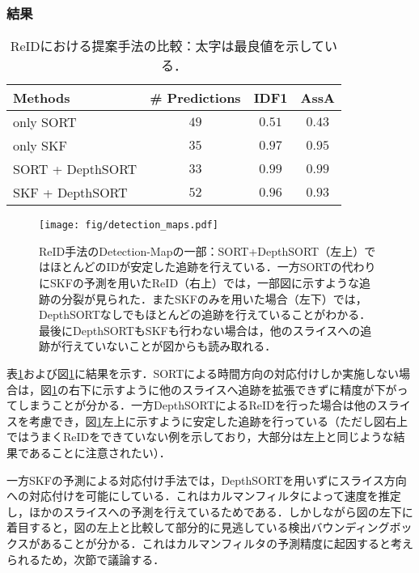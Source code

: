         \subsubsection{結果}

        \begin{table}[t]
            \centering
            \caption[ReIDにおける提案手法の比較]{ReIDにおける提案手法の比較：太字は最良値を示している．}
            \label{tab:reid_evaulation_assa}
            \begin{tabular}{l|ccc}
                Methods & \# Predictions & IDF1 & AssA
                \\ \hline \hline
                only SORT & $49$ & $0.51$ & $0.43$
                \\ only SKF & $35$ & $0.97$ & $0.95$
                \\ SORT + DepthSORT & $33$ & $\bm{0.99}$ & $\bm{0.99}$
                \\ SKF + DepthSORT & $52$ & $0.96$ & $0.93$
            \end{tabular}
        \end{table}

        \begin{figure}[t]
            \centering
            \texttt{[image: fig/detection\_maps.pdf]}
            \caption[ReID手法のDetection-Mapの一部]{ReID手法のDetection-Mapの一部：SORT+DepthSORT（左上）ではほとんどのIDが安定した追跡を行えている．一方SORTの代わりにSKFの予測を用いたReID（右上）では，一部図に示すような追跡の分裂が見られた．またSKFのみを用いた場合（左下）では，DepthSORTなしでもほとんどの追跡を行えていることがわかる．最後にDepthSORTもSKFも行わない場合は，他のスライスへの追跡が行えていないことが図からも読み取れる．}
            \label{fig:detection_maps}
        \end{figure}

        表\ref{tab:reid_evaulation_assa}および図\ref{fig:detection_maps}に結果を示す．SORTによる時間方向の対応付けしか実施しない場合は，図\ref{fig:detection_maps}の右下に示すように他のスライスへ追跡を拡張できずに精度が下がってしまうことが分かる．一方DepthSORTによるReIDを行った場合は他のスライスを考慮でき，図\ref{fig:detection_maps}左上に示すように安定した追跡を行っている（ただし図右上ではうまくReIDをできていない例を示しており，大部分は左上と同じような結果であることに注意されたい）．

        一方SKFの予測による対応付け手法では，DepthSORTを用いずにスライス方向への対応付けを可能にしている．これはカルマンフィルタによって速度を推定し，ほかのスライスへの予測を行えているためである．しかしながら図の左下に着目すると，図の左上と比較して部分的に見逃している検出バウンディングボックスがあることが分かる．これはカルマンフィルタの予測精度に起因すると考えられるため，次節で議論する．

